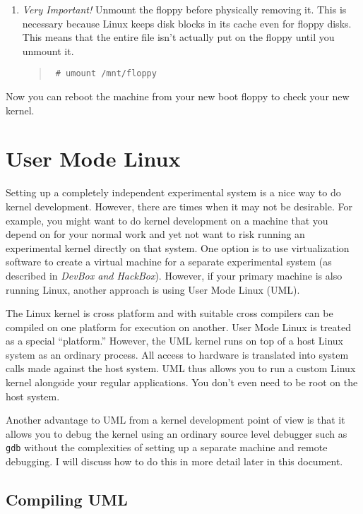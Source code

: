 \documentclass{article}
\newcommand{\command}[1]{\texttt{#1}}
\newenvironment{commands}
  {\begin{quote} \tt}
  {\end{quote}}
\begin{document}
\begin{enumerate}
\item \emph{Very Important!} Unmount the floppy before physically removing it. This is necessary
  because Linux keeps disk blocks in its cache even for floppy disks. This means that the entire
  file isn't actually put on the floppy until you unmount it.
  \begin{commands}
    \# umount /mnt/floppy
  \end{commands}

\end{enumerate}

Now you can reboot the machine from your new boot floppy to check your new kernel.

\section{User Mode Linux}
\label{sec:UML}

Setting up a completely independent experimental system is a nice way to do kernel development.
However, there are times when it may not be desirable. For example, you might want to do kernel
development on a machine that you depend on for your normal work and yet not want to risk
running an experimental kernel directly on that system. One option is to use virtualization
software to create a virtual machine for a separate experimental system (as described in
\textit{DevBox and HackBox}). However, if your primary machine is also running Linux, another
approach is using User Mode Linux (UML).

The Linux kernel is cross platform and with suitable cross compilers can be compiled on one
platform for execution on another. User Mode Linux is treated as a special ``platform.''
However, the UML kernel runs on top of a host Linux system as an ordinary process. All access to
hardware is translated into system calls made against the host system. UML thus allows you to
run a custom Linux kernel alongside your regular applications. You don't even need to be root on
the host system.

Another advantage to UML from a kernel development point of view is that it allows you to debug
the kernel using an ordinary source level debugger such as \command{gdb} without the
complexities of setting up a separate machine and remote debugging. I will discuss how to do
this in more detail later in this document.

\subsection{Compiling UML}
\end{document}

